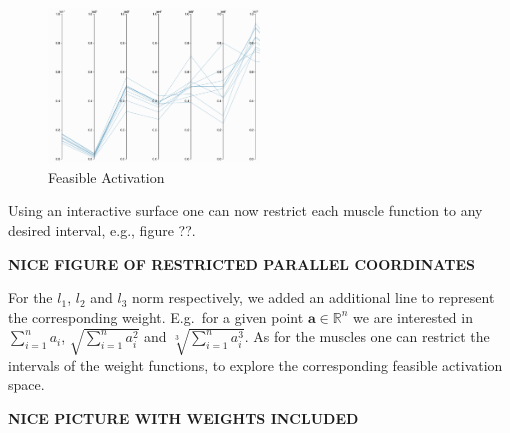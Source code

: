 \begin{figure}[ht]
   \begin{center}
    \includegraphics[width=0.5\textwidth]{pc.png}
  \end{center}
  \caption{Feasible Activation}
  \label{fig_pc}
\end{figure}

Using an interactive surface one can now restrict each muscle function to any desired interval, e.g., figure ??.

\textbf{NICE FIGURE OF RESTRICTED PARALLEL COORDINATES}

For the $l_1$, $l_2$ and $l_3$ norm respectively, we added an additional line to represent the corresponding weight. E.g.\ for a given point $\textbf{a} \in \mathbb{R}^n$ we are interested in $\sum_{i=1}^n a_i$, $\sqrt{\sum_{i=1}^n a_i^2}$ and $\sqrt[3]{\sum_{i=1}^n a_i^3}$. As for the muscles one can restrict the intervals of the weight functions, to explore the corresponding feasible activation space. 

\textbf{NICE PICTURE WITH WEIGHTS INCLUDED}
